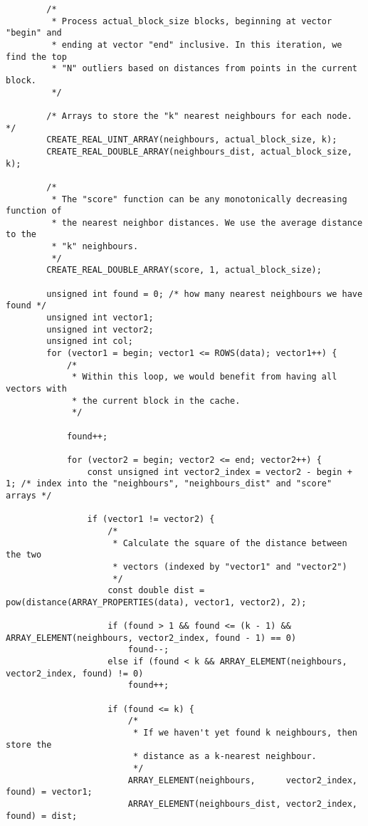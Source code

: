 \begin{lstlisting}
    	/* 
    	 * Process actual_block_size blocks, beginning at vector "begin" and 
    	 * ending at vector "end" inclusive. In this iteration, we find the top
    	 * "N" outliers based on distances from points in the current block.
    	 */
        
        /* Arrays to store the "k" nearest neighbours for each node. */
        CREATE_REAL_UINT_ARRAY(neighbours, actual_block_size, k); 
        CREATE_REAL_DOUBLE_ARRAY(neighbours_dist, actual_block_size, k);
        
        /* 
         * The "score" function can be any monotonically decreasing function of 
         * the nearest neighbor distances. We use the average distance to the 
         * "k" neighbours.
         */
        CREATE_REAL_DOUBLE_ARRAY(score, 1, actual_block_size);

        unsigned int found = 0; /* how many nearest neighbours we have found */
        unsigned int vector1;
        unsigned int vector2;
        unsigned int col;
        for (vector1 = begin; vector1 <= ROWS(data); vector1++) {
        	/*
        	 * Within this loop, we would benefit from having all vectors with 
        	 * the current block in the cache.
        	 */
        
            found++;
            
            for (vector2 = begin; vector2 <= end; vector2++) {
            	const unsigned int vector2_index = vector2 - begin + 1; /* index into the "neighbours", "neighbours_dist" and "score" arrays */

                if (vector1 != vector2) {                
                	/* 
                	 * Calculate the square of the distance between the two 
                	 * vectors (indexed by "vector1" and "vector2")
                	 */
                    const double dist = pow(distance(ARRAY_PROPERTIES(data), vector1, vector2), 2);

					if (found > 1 && found <= (k - 1) && ARRAY_ELEMENT(neighbours, vector2_index, found - 1) == 0)
                        found--;
                    else if (found < k && ARRAY_ELEMENT(neighbours, vector2_index, found) != 0)
                        found++;

                    if (found <= k) {
                    	/* 
                    	 * If we haven't yet found k neighbours, then store the 
                    	 * distance as a k-nearest neighbour.
                    	 */
                        ARRAY_ELEMENT(neighbours,      vector2_index, found) = vector1;
                        ARRAY_ELEMENT(neighbours_dist, vector2_index, found) = dist;
                        

\end{lstlisting}
